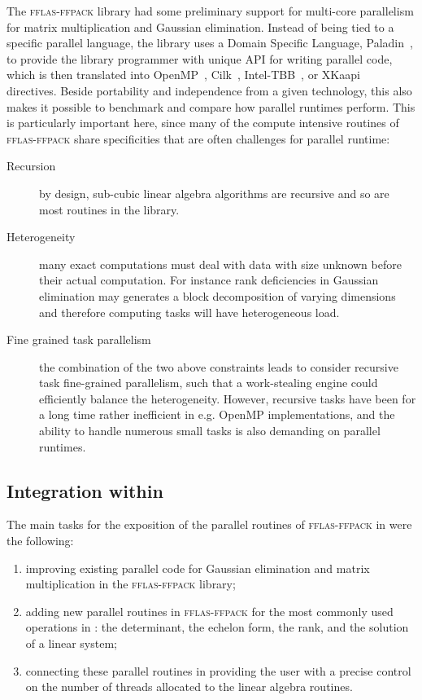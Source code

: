 \documentclass{deliverablereport}
\newcommand{\fflasffpack}{\textsc{fflas-ffpack}\xspace}
\begin{document}
The \fflasffpack library had some preliminary support for multi-core parallelism for matrix
multiplication and Gaussian elimination.
Instead of being tied to a specific parallel language, the library uses a Domain Specific Language, Paladin~\cite{paladin},
to provide the library programmer with unique API for writing parallel code, which is then translated into 
OpenMP~\cite{openmp}, Cilk~\cite{cilk}, Intel-TBB~\cite{tbb}, or XKaapi~\cite{xkaapi} directives. Beside portability and independence from
a given technology, this also makes it possible to benchmark and compare how parallel runtimes perform. This is
particularly important here, since many of the compute intensive routines of \fflasffpack share specificities that are
often challenges for parallel runtime:
\begin{description}
\item[Recursion] by design, sub-cubic linear algebra algorithms are recursive and so are most routines in the
  library.
\item[Heterogeneity] many exact computations must deal with data with size unknown before their actual computation. For
  instance rank deficiencies in Gaussian elimination may generates a block decomposition of varying dimensions and
  therefore computing tasks will have heterogeneous load.
\item[Fine grained task parallelism] the combination of the two above constraints leads to consider recursive task
  fine-grained parallelism, such that a work-stealing engine could efficiently balance the heterogeneity. However,
  recursive tasks have been for a long time rather inefficient in e.g. OpenMP implementations, and the ability to handle
  numerous small tasks is also demanding on parallel runtimes.
\end{description}

\subsection{Integration within \SageMath}

The main tasks for the exposition of the parallel routines of \fflasffpack in \SageMath were the following:
\begin{enumerate}
\item improving existing parallel code for Gaussian elimination and matrix multiplication in the \fflasffpack library;
\item adding new parallel routines in \fflasffpack for the most commonly used operations in \SageMath: the determinant,
  the echelon form, the rank, and the solution of a linear system;
\item connecting these parallel routines in \SageMath  providing  the user
  with a precise control on the number of threads allocated to the linear algebra routines. 
\end{enumerate}
\end{document}
